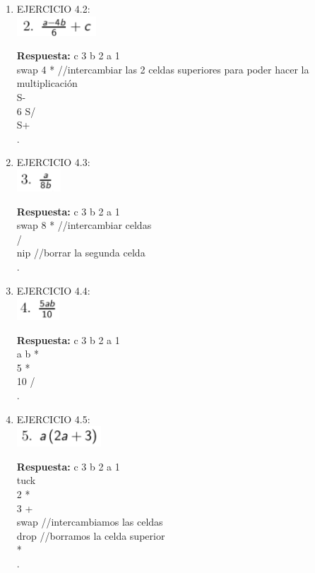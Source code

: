 \documentclass[conference]{IEEEtran}
\begin{document}
\begin{enumerate}
\item EJERCICIO 4.2: \\
	\includegraphics{e4.2}
	\begin{center}
	\textbf{Respuesta: } c 3 b 2 a 1 \\ swap 4 * //intercambiar las 2 celdas superiores para poder hacer la multiplicación \\ S- \\ 6 S/ \\ S+ \\ .
	\end{center}	
	
\item EJERCICIO 4.3: \\
	\includegraphics{e4.3}
	\begin{center}
	\textbf{Respuesta: } c 3 b 2 a 1 \\ swap 8 * //intercambiar celdas \\ / \\ nip //borrar la segunda celda \\ .
	\end{center}	
	
\item EJERCICIO 4.4: \\
	\includegraphics{e4.4}
	\begin{center}
	\textbf{Respuesta: } c 3 b 2 a 1 \\ a b * \\ 5 * \\ 10 / \\ .
	\end{center}
	
\item EJERCICIO 4.5: \\
	\includegraphics{e4.5}
	\begin{center}
	\textbf{Respuesta: } c 3 b 2 a 1 \\ tuck \\ 2 * \\ 3 + \\ swap //intercambiamos las celdas \\ drop //borramos la celda superior \\ * \\ .
	\end{center}
	

\end{enumerate}
\end{document}
